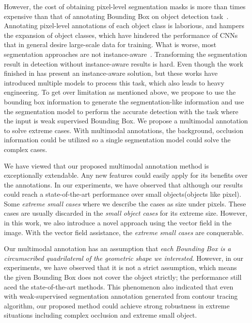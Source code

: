 \documentclass{article}
\begin{document}
{However, the cost of obtaining pixel-level segmentation masks is more than  times expensive than that of annotating Bounding Box on object detection task~\cite{lin2014microsoft}. Annotating pixel-level annotations of each object class is laborious, and hampers the expansion of object classes, which have hindered the performance of CNNs that in general desire large-scale data for training. What is worse, most segmentation approaches are not instance-aware~\cite{dai2016fcn,dai2015convolutional,dai2016instance}. Transforming the segmentation result in detection without instance-aware results is hard. Even though the work finished in \cite{dai2016fcn,dai2016instance} has present an instance-aware solution, but these works have introduced multiple models to process this task, which also leads to heavy engineering.
To get over limitation as mentioned above, we propose to use the bounding box information to generate the segmentation-like information and use the segmentation model to perform the accurate detection with the task where the input is weak supervised Bounding Box. We propose a multimodal annotation to solve extreme cases. With multimodal annotations, the background, occlusion information could be utilized so a single segmentation model could solve the complex cases. 


We have viewed that our proposed multimodal annotation method is exceptionally extendable. Any new features could easily apply for its benefits over the annotations.
In our experiments, we have observed that although our results could reach a state-of-the-art performance over small objects(objects like  pixel). Some \textit{extreme small cases} where we describe the cases as size under  pixels. These cases are usually discarded in the \textit{small object cases} for its extreme size. However, in this work, we also introduce a novel approach using the vector field in the image. With the vector field assistance, the \textit{extreme small cases} are conquerable. 


Our multimodal annotation has an assumption that \textit{each Bounding Box is a circumscribed quadrilateral of the geometric shape we interested}. However, in our experiments, we have observed that it is not a strict assumption, which means the given Bounding Box does not cover the object strictly; the performance still aced the state-of-the-art methods.
This phenomenon also indicated that even with weak-supervised segmentation annotation generated from contour tracing algorithm, our proposed method could achieve strong robustness in extreme situations including complex occlusion and extreme small object.


}
\end{document}

